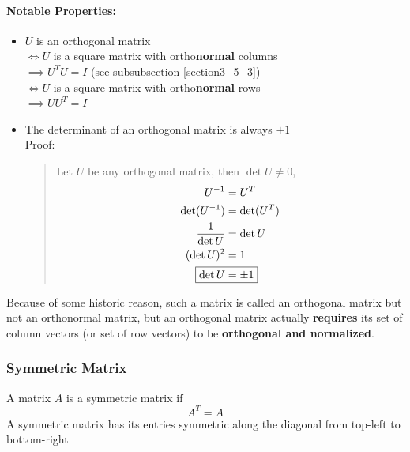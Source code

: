 \documentclass[11pt]{article}
\newcommand{\mymat}[1]{#1}
\begin{document}
    \paragraph{Notable Properties: }
    \begin{itemize}
        \item $\mymat{U}$ is an orthogonal matrix \\ 
            $\iff \mymat{U}$ is a square matrix with ortho\textbf{normal} columns \\
            \quad $\implies \mymat{U}^T \mymat{U} = \mymat{I}$ (see subsubsection \ref{section3_5_3})\\
            $\iff \mymat{U}$ is a square matrix with ortho\textbf{normal} rows \\
            \quad $\implies \mymat{U} \mymat{U}^T = \mymat{I}$ \\
        \item The determinant of an orthogonal matrix is always $\pm 1$ \\
            Proof: 
            \begin{quote}
                Let $\mymat{U}$ be any orthogonal matrix, then $\det \mymat{U} \ne 0$,
                \begin{align*}
                    \mymat{U}^{-1} &= \mymat{U}^T \\
                    \det(\mymat{U}^{-1}) &= \det(\mymat{U}^T) \\
                    \frac{1}{\det\mymat{U}} &= \det \mymat{U} \\
                    ( \det \mymat{U} )^2 &= 1 \\
                    \Aboxed{\det \mymat{U} &= \pm 1}
                \end{align*}
            \end{quote}
        \end{itemize}
    Because of some historic reason, such a matrix is called an orthogonal matrix but not an orthonormal matrix, 
    but an orthogonal matrix actually \textbf{requires} its set of column vectors (or set of row vectors) to be \textbf{orthogonal and normalized}.
    
    \subsubsection{Symmetric Matrix}
    A matrix $\mymat{A}$ is a symmetric matrix if 
    \begin{equation}
        \mymat{A}^T = \mymat{A}
    \end{equation}
    A symmetric matrix has its entries symmetric along the diagonal from top-left to bottom-right
\end{document}
